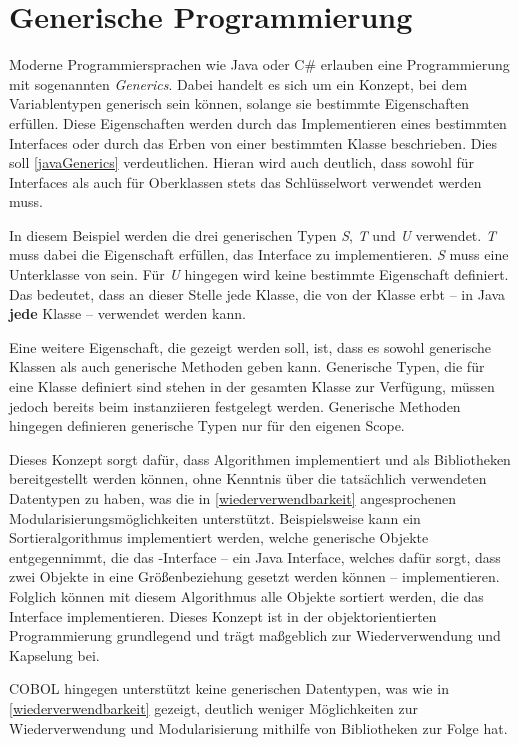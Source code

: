 \section{Generische Programmierung}
Moderne Programmiersprachen wie Java oder C\# erlauben eine Programmierung mit sogenannten \textit{Generics}. Dabei handelt es sich um ein Konzept, bei dem Variablentypen generisch sein können, solange sie bestimmte Eigenschaften erfüllen. Diese Eigenschaften werden durch das Implementieren eines bestimmten Interfaces oder durch das Erben von einer bestimmten Klasse beschrieben. Dies soll \autoref{javaGenerics} verdeutlichen. Hieran wird auch deutlich, dass sowohl für Interfaces als auch für Oberklassen stets das Schlüsselwort  verwendet werden muss.


In diesem Beispiel werden die drei generischen Typen \textit{S}, \textit{T} und \textit{U} verwendet. \textit{T} muss dabei die Eigenschaft erfüllen, das  Interface zu implementieren. \textit{S} muss eine Unterklasse von  sein. Für \textit{U} hingegen wird keine bestimmte Eigenschaft definiert. Das bedeutet, dass an dieser Stelle jede Klasse, die von der Klasse  erbt -- in Java \textbf{jede} Klasse -- verwendet werden kann. 

Eine weitere Eigenschaft, die gezeigt werden soll, ist, dass es sowohl generische Klassen als auch generische Methoden geben kann. Generische Typen, die für eine Klasse definiert sind stehen in der gesamten Klasse zur Verfügung, müssen jedoch bereits beim instanziieren festgelegt werden. Generische Methoden hingegen definieren generische Typen nur für den eigenen Scope.

Dieses Konzept sorgt dafür, dass Algorithmen implementiert und als Bibliotheken bereitgestellt werden können, ohne Kenntnis über die tatsächlich verwendeten Datentypen zu haben, was die in \autoref{wiederverwendbarkeit} angesprochenen Modularisierungsmöglichkeiten unterstützt. Beispielsweise kann ein Sortieralgorithmus implementiert werden, welche generische Objekte entgegennimmt, die das -Interface -- ein Java Interface, welches dafür sorgt, dass zwei Objekte in eine Größenbeziehung gesetzt werden können -- implementieren. Folglich können mit diesem Algorithmus alle Objekte sortiert werden, die das Interface implementieren. Dieses Konzept ist in der objektorientierten Programmierung grundlegend und trägt maßgeblich zur Wiederverwendung und Kapselung bei.

COBOL hingegen unterstützt keine generischen Datentypen, was wie in \autoref{wiederverwendbarkeit} gezeigt, deutlich weniger Möglichkeiten zur Wiederverwendung und Modularisierung mithilfe von Bibliotheken zur Folge hat.